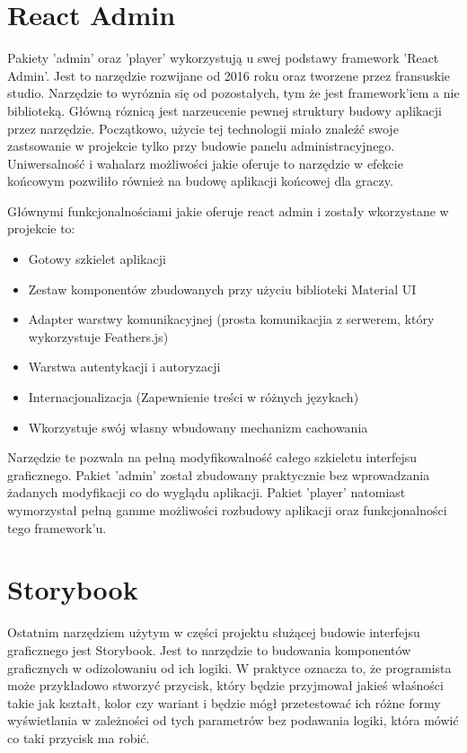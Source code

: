 \section{React Admin}
Pakiety 'admin' oraz 'player' wykorzystują u swej podstawy framework 'React Admin'. Jest to narzędzie rozwijane od 2016 roku oraz tworzene przez fransuskie studio. Narzędzie to wyróznia się od pozostałych, tym że jest framework'iem a nie biblioteką. Główną róznicą jest narzeucenie pewnej struktury budowy aplikacji przez narzędzie. Początkowo, użycie tej technologii miało znaleźć swoje zastsowanie w projekcie tylko przy budowie panelu administracyjnego. Uniwersalność i wahalarz możliwości jakie oferuje to narzędzie w efekcie końcowym pozwiliło również na budowę aplikacji końcowej dla graczy.

Głównymi funkcjonalnościami jakie oferuje react admin i zostały wkorzystane w projekcie to:

\begin{itemize}
    \item Gotowy szkielet aplikacji
    \item Zestaw komponentów zbudowanych przy użyciu biblioteki Material UI
    \item Adapter warstwy komunikacyjnej (prosta komunikacjia z serwerem, który wykorzystuje Feathers.js)
    \item Warstwa autentykacji i autoryzacji
    \item Internacjonalizacja (Zapewnienie treści w różnych językach)
    \item Wkorzystuje swój własny wbudowany mechanizm cachowania
\end{itemize}

Narzędzie te pozwala na pełną modyfikowalność całego szkieletu interfejsu graficznego. Pakiet 'admin' został zbudowany praktycznie bez wprowadzania żadanych modyfikacji co do wyglądu aplikacji. Pakiet 'player' natomiast wymorzystał pełną gamme możliwości rozbudowy aplikacji oraz funkcjonalności tego framework'u.

\section{Storybook}
Ostatnim narzędziem użytym w części projektu służącej budowie interfejsu graficznego jest Storybook. Jest to narzędzie to budowania komponentów graficznych w odizolowaniu od ich logiki. W praktyce oznacza to, że programista może przykładowo stworzyć przycisk, który będzie przyjmował jakieś właśności takie jak kształt, kolor czy wariant i będzie mógł przetestować ich różne formy wyświetlania w zależności od tych parametrów bez podawania logiki, która mówić co taki przycisk ma robić.

